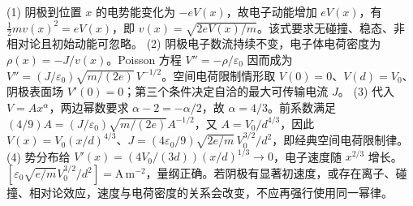 (1) 阴极到位置 \(x\) 的电势能变化为 \(-eV(x)\)，故电子动能增加 \(eV(x)\)，有 \(\frac12mv(x)^2=eV(x)\)，即 \(v(x)=\sqrt{2eV(x)/m}\)。该式要求无碰撞、稳态、非相对论且初始动能可忽略。
(2) 阴极电子数流持续不变，电子体电荷密度为 \(\rho(x)=-J/v(x)\)。Poisson 方程 \(V''=-\rho/\varepsilon_0\) 因而成为 \(V''=(J/\varepsilon_0)\sqrt{m/(2e)}\,V^{-1/2}\)。空间电荷限制情形取 \(V(0)=0\)、\(V(d)=V_0\)、阴极表面场 \(V'(0)=0\)；第三个条件决定自洽的最大可传输电流 \(J\)。
(3) 代入 \(V=Ax^\alpha\)，两边幂数要求 \(\alpha-2=-\alpha/2\)，故 \(\alpha=4/3\)。前系数满足 \((4/9)A=(J/\varepsilon_0)\sqrt{m/(2e)}A^{-1/2}\)，又 \(A=V_0/d^{4/3}\)，因此 \(V(x)=V_0(x/d)^{4/3}\)、\(J=(4\varepsilon_0/9)\sqrt{2e/m}\,V_0^{3/2}/d^2\)，即经典空间电荷限制律。
(4) 势分布给 \(V'(x)=(4V_0/(3d))(x/d)^{1/3}\to0\)，电子速度随 \(x^{2/3}\) 增长。\([\varepsilon_0\sqrt{e/m}V_0^{3/2}/d^2]=\mathrm{A\,m^{-2}}\)，量纲正确。若阴极有显著初速度，或存在离子、碰撞、相对论效应，速度与电荷密度的关系会改变，不应再强行使用同一幂律。
